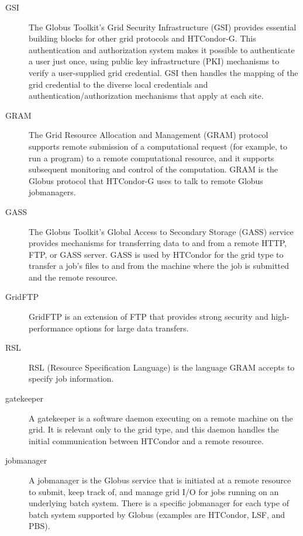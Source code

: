 \begin{description}
\item[GSI]
The Globus Toolkit's Grid Security Infrastructure (GSI) provides essential
building blocks for other grid protocols and HTCondor-G.
This authentication and authorization system
makes it possible to authenticate a user just once,
using public key infrastructure (PKI) mechanisms to verify
a user-supplied grid credential.
GSI then handles the mapping of the grid credential to the
diverse local credentials and authentication/authorization mechanisms that
apply at each site. 
\item[GRAM]
The Grid Resource Allocation and Management (GRAM) protocol supports remote
submission of a computational request (for example, to run a program)
to a remote computational resource,
and it supports subsequent monitoring and control of the computation. 
GRAM is the Globus protocol that HTCondor-G uses to talk to remote Globus
  jobmanagers.
\item[GASS]
The Globus Toolkit's Global Access to Secondary Storage (GASS) service provides
mechanisms for transferring data to and from a remote HTTP, FTP, or GASS server. 
GASS is used by HTCondor for the 
 grid type
to transfer a job's files
to and from the machine where the job is submitted and the remote resource.
\item[GridFTP]
GridFTP is an extension of FTP that provides strong security and 
high-performance options for large data transfers.
\item[RSL]
RSL (Resource Specification Language)  is the language GRAM 
accepts to specify job information.
\item[gatekeeper]
A gatekeeper is a software daemon executing on a remote machine on
the grid.
It is relevant only to the  grid type,
and this daemon handles the initial communication between
HTCondor and a remote resource.
\item[jobmanager]
A jobmanager is
the Globus service that is initiated at a remote resource to submit,
keep track of, and manage grid I/O for jobs running on 
an underlying batch system.
There is a specific jobmanager for each type of
batch system supported by Globus (examples are HTCondor, LSF, and PBS).

\end{description}

